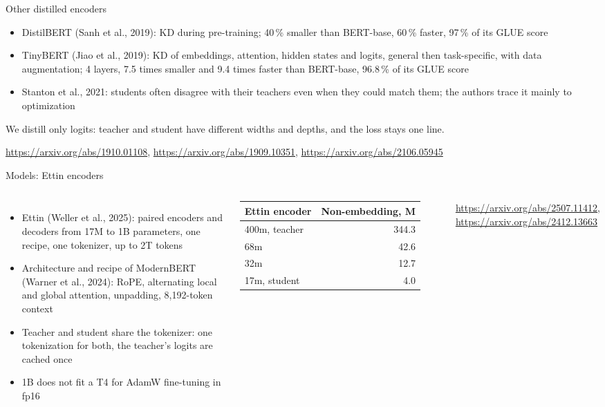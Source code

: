\documentclass[aspectratio=169,11pt]{beamer}
\begin{document}
\begin{frame}{Other distilled encoders}
  \begin{itemize}
    \item DistilBERT (Sanh et al., 2019): KD during pre-training; 40\,\% smaller than BERT-base, 60\,\% faster, 97\,\% of its GLUE score
    \item TinyBERT (Jiao et al., 2019): KD of embeddings, attention, hidden states and logits, general then task-specific, with data augmentation; 4 layers, 7.5 times smaller and 9.4 times faster than BERT-base, 96.8\,\% of its GLUE score
    \item Stanton et al., 2021: students often disagree with their teachers even when they could match them; the authors trace it mainly to optimization
  \end{itemize}
  \medskip
  We distill only logits: teacher and student have different widths and depths, and the loss stays one line.

  \medskip
  \footnotesize \url{https://arxiv.org/abs/1910.01108}, \url{https://arxiv.org/abs/1909.10351}, \url{https://arxiv.org/abs/2106.05945}
\end{frame}

\begin{frame}{Models: Ettin encoders}
  \begin{columns}[T]
    \begin{itemize}
      \item Ettin (Weller et al., 2025): paired encoders and decoders from 17M to 1B parameters, one recipe, one tokenizer, up to 2T tokens
      \item Architecture and recipe of ModernBERT (Warner et al., 2024): RoPE, alternating local and global attention, unpadding, 8,192-token context
      \item Teacher and student share the tokenizer: one tokenization for both, the teacher's logits are cached once
      \item 1B does not fit a T4 for AdamW fine-tuning in fp16
    \end{itemize}
    \small
    \begin{tabular}{lr}
      \toprule
      Ettin encoder & Non-embedding, M \\
      \midrule
      400m, teacher & 344.3 \\
      68m & 42.6 \\
      32m & 12.7 \\
      17m, student & 4.0 \\
      \bottomrule
    \end{tabular}

    \footnotesize \url{https://arxiv.org/abs/2507.11412}, \url{https://arxiv.org/abs/2412.13663}
  \end{columns}
\end{frame}
\end{document}
